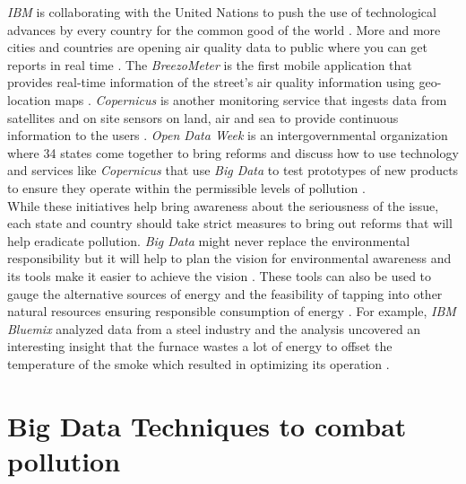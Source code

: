 \documentclass[sigconf]{acmart}
\begin{document}
{\em IBM} is collaborating with the United Nations to push the use of technological advances by every country for the common good of the world \cite{www-huff}. More and more cities and countries are opening air quality data to public where you can get reports in real time \cite{www-ferro}. The {\em BreezoMeter} is the first mobile application that provides real-time information of the street's air quality information using geo-location maps \cite{www-ferro}. {\em Copernicus} is another monitoring service that ingests data from satellites and on site sensors on land, air and sea to provide continuous information to the users \cite{www-ferro}. {\em Open Data Week} is an intergovernmental organization where 34 states come together to bring reforms and discuss how to use technology and services like {\em Copernicus} that use {\em Big Data} to test prototypes of new products to ensure they operate within the permissible levels of pollution \cite{www-ferro}. \\
While these initiatives help bring awareness about the seriousness of the issue, each state and country should take strict measures to bring out reforms that will help eradicate pollution. {\em Big Data} might never replace the environmental responsibility but it will help to plan the vision for environmental awareness and its tools make it easier to achieve the vision \cite{www-ferro}. These tools can also be used to gauge the alternative sources of energy and the feasibility of tapping into other natural resources ensuring responsible consumption of energy \cite{www-ferro}. For example, {\em IBM Bluemix} analyzed data from a steel industry and the analysis uncovered an interesting insight that the furnace wastes a lot of energy to offset the temperature of the smoke which resulted in optimizing its operation \cite{www-ibm1}.

\section{Big Data Techniques to combat pollution}
\end{document}
